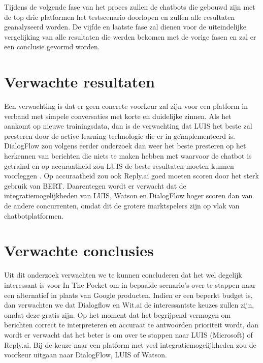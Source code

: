 \bigskip
Tijdens de volgende fase van het proces zullen de chatbots die gebouwd zijn met de top drie platformen het testscenario doorlopen en zullen alle resultaten geanalyseerd worden.
De vijfde en laatste fase zal dienen voor de uiteindelijke vergelijking van alle resultaten die werden bekomen met de vorige fasen en zal er een conclusie gevormd worden.


\section{Verwachte resultaten}
\label{sec:verwachte_resultaten} 

Een verwachting is dat er geen concrete voorkeur zal zijn voor een platform in verband met simpele conversaties met korte en duidelijke zinnen. Als het aankomt op nieuwe trainingsdata, dan is de verwachting dat LUIS het beste zal presteren door de active learning technologie die er in geïmplementeerd is. DialogFlow zou volgens eerder onderzoek dan weer het beste presteren op het herkennen van berichten die niets te maken hebben met waarvoor de chatbot is getraind en op accuraatheid zou LUIS de beste resultaten moeten kunnen voorleggen \autocite{Russis2018}. Op accuraatheid zou ook Reply.ai goed moeten scoren door het sterk gebruik van BERT. Daarentegen wordt er verwacht dat de integratiemogelijkheden van LUIS, Watson en DialogFlow hoger scoren dan van de andere concurrenten, omdat dit de grotere marktspelers zijn op vlak van chatbotplatformen.

\section{Verwachte conclusies}
\label{sec:verwachte_conclusies}

Uit dit onderzoek verwachten we te kunnen concluderen dat het wel degelijk interessant is voor In The Pocket om in bepaalde scenario’s over te stappen naar een alternatief in plaats van Google producten. Indien er een beperkt budget is, dan verwachten we dat Dialogflow en Wit.ai de interessantste keuzes zullen zijn, omdat deze gratis zijn. Op het moment dat het begrijpend vermogen om berichten correct te interpreteren en accuraat te antwoorden prioriteit wordt, dan wordt er verwacht dat het beter is om over te stappen naar LUIS (Microsoft) of Reply.ai. Bij de keuze naar een platform met veel integratiemogelijkheden zou de voorkeur uitgaan naar DialogFlow, LUIS of Watson.

